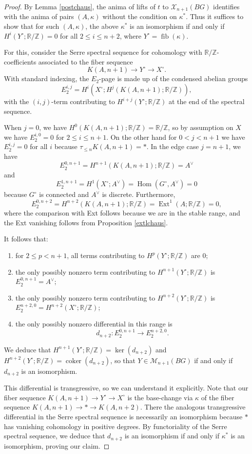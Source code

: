 \documentclass[12pt]{article}
\theoremstyle{definition}
\newcommand{\on}{\operatorname}
\newcommand{\mc}{\mathcal}
\newcommand{\mbb}{\mathbb}
\begin{document}
\begin{proof}
By Lemma \ref{postchaus}, the anima of lifts of $t$ to $\mc{X}_{n+1}(BG)$ identifies with the anima of pairs $(A,\kappa)$ without the condition on $\kappa^\ast$.  Thus it suffices to show that for such $(A,\kappa)$, the above $\kappa^\ast$ is an isomorphism if and only if $H^i(Y^\circ;\mbb{R}/\mbb{Z})=0$ for all $2\leq i\leq n+2$, where $Y^\circ=\on{fib}(\kappa)$.

For this, consider the Serre spectral sequence for cohomology with $\mbb{R}/\mbb{Z}$-coefficients associated to the fiber sequence
$$K(A,n+1) \to Y^\circ \to X^\circ.$$
With standard indexing, the $E_2$-page is made up of the condensed abelian groups
$$E_2^{i,j}=H^i(X^\circ; H^j(K(A,n+1);\mbb{R}/\mbb{Z})),$$
with the $(i,j)$-term contributing to $H^{i+j}(Y^\circ;\mbb{R}/\mbb{Z})$ at the end of the spectral sequence.

When $j=0$, we have $H^0(K(A,n+1);\mbb{R}/\mbb{Z})=\mbb{R}/\mbb{Z}$, so by assumption on $X$ we have $E_2^{i,0}=0$ for $2\leq i\leq n+1$.  On the other hand for $0<j<n+1$ we have $E_2^{i,j}=0$ for all $i$ because $\tau_{\leq n}K(A,n+1)=\ast$.  In the edge case $j=n+1$, we have
$$E_2^{0,n+1}=H^{n+1}(K(A,n+1);\mbb{R}/\mbb{Z})=A^\vee$$
and
$$E_2^{1,n+1} = H^1(X^\circ;A^\vee) = \on{Hom}(G^\circ,A^\vee)=0$$
because $G^\circ$ is connected and $A^\vee$ is discrete.  Furthermore,
$$E_2^{0,n+2} = H^{n+2}(K(A,n+1);\mbb{R}/\mbb{Z}) = \on{Ext}^1(A;\mbb{R}/\mbb{Z})=0,$$
where the comparison with Ext follows because we are in the stable range, and the Ext vanishing follows from Proposition \ref{extlchaus}.

It follows that:
\begin{enumerate}
\item for $2\leq p<n+1$, all terms contributing to $H^p(Y^\circ;\mbb{R}/\mbb{Z})$ are $0$;
\item the only possibly nonzero term contributing to $H^{n+1}(Y^\circ;\mbb{R}/\mbb{Z})$ is $E_2^{0,n+1} = A^\vee$;
\item the only possibly nonzero term contributing to $H^{n+2}(Y^\circ;\mbb{R}/\mbb{Z})$ is $E_2^{n+2,0} = H^{n+2}(X^\circ;\mbb{R}/\mbb{Z})$;
\item the only possibly nonzero differential in this range is
$$d_{n+2}: E_2^{0,n+1} \to E_2^{n+2,0}.$$
\end{enumerate}

We deduce that $H^{n+1}(Y^\circ;\mbb{R}/\mbb{Z})= \on{ker}(d_{n+2})$ and $H^{n+2}(Y^\circ;\mbb{R}/\mbb{Z})=\on{coker}(d_{n+2})$, so that $Y\in \mc{M}_{n+1}(BG)$ if and only if $d_{n+2}$ is an isomorphism.

This differential is transgressive, so we can understand it explicitly. Note that our fiber sequence $K(A,n+1) \to Y^\circ \to X^\circ$ is the base-change via $\kappa$ of the fiber sequence $K(A,n+1) \to \ast \to K(A,n+2)$.   There the analogous transgressive differential in the Serre spectral sequence is necessarily an isomorphism because $\ast$ has vanishing cohomology in positive degrees.  By functoriality of the Serre spectral sequence, we deduce that $d_{n+2}$ is an isomorphism if and only if $\kappa^\ast$ is an isomorphism, proving our claim.
\end{proof}
\end{document}
